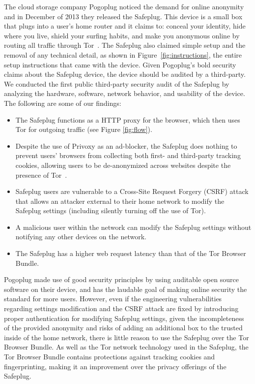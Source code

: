 \documentclass[letterpaper,twocolumn,10pt]{article}
\begin{document}
The cloud storage company Pogoplug noticed the demand for online anonymity and in December of 2013 they released the Safeplug.  This device is a small box that plugs into a user's home router and it claims to: conceal your identity, hide where you live, shield your surfing habits, and make you anonymous online by routing all traffic through Tor~\cite{safeplug}.  The Safeplug also claimed simple setup and the removal of any technical detail, as shown in Figure~\ref{fig:instructions}, the entire setup instructions that came with the device.  Given Pogoplug's bold security claims about the Safeplug device, the device should be audited by a third-party.  We conducted the first public third-party security audit of the Safeplug by analyzing the hardware, software, network behavior, and usability of the device.  The following are some of our findings:

\begin{itemize}
\item The Safeplug functions as a HTTP proxy for the browser, which then uses Tor for outgoing traffic (see Figure \ref{fig:flow}).
\item Despite the use of Privoxy as an ad-blocker, the Safeplug does nothing to prevent users' browsers from collecting both first- and third-party tracking cookies, allowing users to be de-anonymized across websites despite the presence of Tor~\cite{arvindpets}.
\item Safeplug users are vulnerable to a Cross-Site Request Forgery (CSRF) attack that allows an attacker external to their home network to modify the Safeplug settings (including silently turning off the use of Tor).
\item A malicious user within the network can modify the Safeplug settings without notifying any other devices on the network.
\item The Safeplug has a higher web request latency than that of the Tor Browser Bundle.
\end{itemize} 

Pogoplug made use of good security principles by using auditable open source software on their device, and has the laudable goal of making online security the standard for more users.  However, even if the engineering vulnerabilities regarding settings modification and the CSRF attack are fixed by introducing proper authentication for modifying Safeplug settings, given the incompleteness of the provided anonymity and risks of adding an additional box to the trusted inside of the home network, there is little reason to use the Safeplug over the Tor Browser Bundle.  As well as the Tor network technology used in the Safeplug, the Tor Browser Bundle contains protections against tracking cookies and fingerprinting, making it an improvement over the privacy offerings of the Safeplug.
\end{document}
